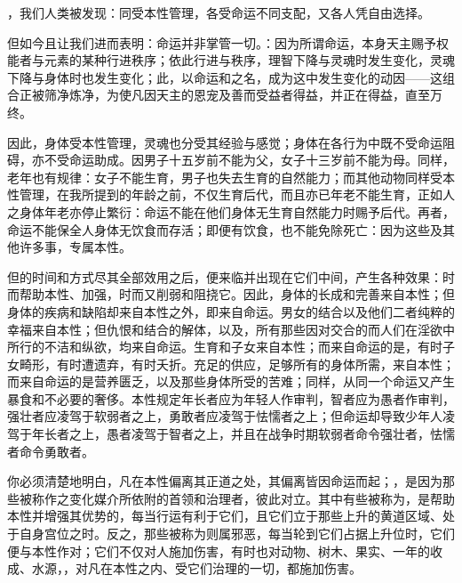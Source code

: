 ，我们人类被发现：同受本性管理，各受命运不同支配，又各人凭自由选择。\par

但如今且让我们进而表明：命运并非掌管一切。：因为所谓命运，本身天主赐予权能者与元素的某种行进秩序；依此行进与秩序，理智下降与灵魂时发生变化，灵魂下降与身体时也发生变化；此，以命运和之名，成为这中发生变化的动因——这组合正被筛净炼净，为使凡因天主的恩宠及善而受益者得益，并正在得益，直至万终。\par

因此，身体受本性管理，灵魂也分受其经验与感觉；身体在各行为中既不受命运阻碍，亦不受命运助成。因男子十五岁前不能为父，女子十三岁前不能为母。同样，老年也有规律：女子不能生育，男子也失去生育的自然能力；而其他动物同样受本性管理，在我所提到的年龄之前，不仅生育后代，而且亦已年老不能生育，正如人之身体年老亦停止繁衍：命运不能在他们身体无生育自然能力时赐予后代。再者，命运不能保全人身体无饮食而存活；即便有饮食，也不能免除死亡：因为这些及其他许多事，专属本性。\par

但的时间和方式尽其全部效用之后，便来临并出现在它们中间，产生各种效果：时而帮助本性、加强，时而又削弱和阻挠它。因此，身体的长成和完善来自本性；但身体的疾病和缺陷却来自本性之外，即来自命运。男女的结合以及他们二者纯粹的幸福来自本性；但仇恨和结合的解体，以及，所有那些因对交合的而人们在淫欲中所行的不洁和纵欲，均来自命运。生育和子女来自本性；而来自命运的是，有时子女畸形，有时遭遗弃，有时夭折。充足的供应，足够所有的身体所需，来自本性；而来自命运的是营养匮乏，以及那些身体所受的苦难；同样，从同一个命运又产生暴食和不必要的奢侈。本性规定年长者应为年轻人作审判，智者应为愚者作审判，强壮者应凌驾于软弱者之上，勇敢者应凌驾于怯懦者之上；但命运却导致少年人凌驾于年长者之上，愚者凌驾于智者之上，并且在战争时期软弱者命令强壮者，怯懦者命令勇敢者。\par

你必须清楚地明白，凡在本性偏离其正道之处，其偏离皆因命运而起；，是因为那些被称作之变化媒介所依附的首领和治理者，彼此对立。其中有些被称为，是帮助本性并增强其优势的，每当行运有利于它们，且它们立于那些上升的黄道区域、处于自身宫位之时。反之，那些被称为则属邪恶，每当轮到它们占据上升位时，它们便与本性作对；它们不仅对人施加伤害，有时也对动物、树木、果实、一年的收成、水源，，对凡在本性之内、受它们治理的一切，都施加伤害。\par

